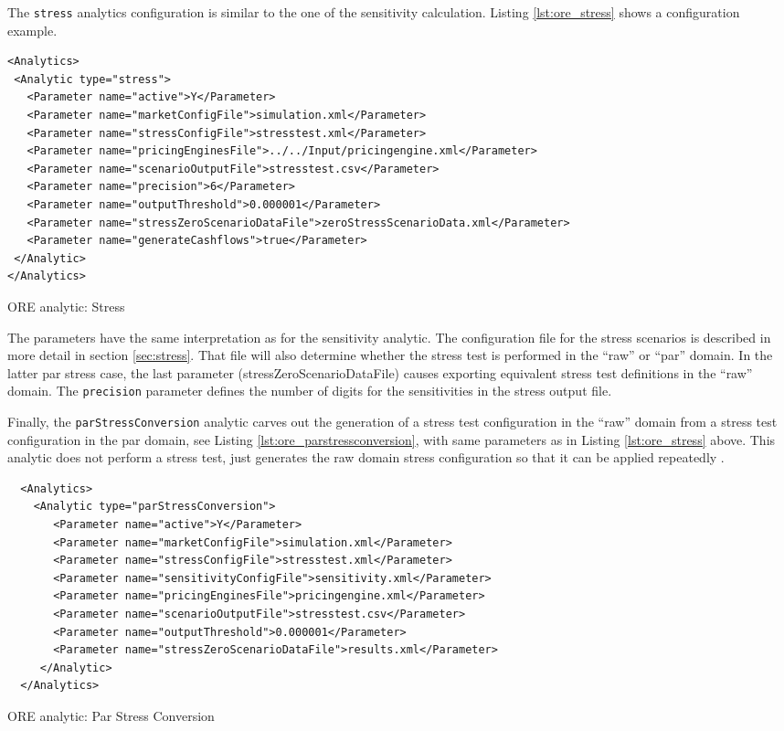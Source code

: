 The {\tt stress} analytics configuration is similar to the one of the sensitivity calculation.
Listing \ref{lst:ore_stress} shows a configuration example.

\begin{listing}[H]
\begin{verbatim}
<Analytics>
 <Analytic type="stress">
   <Parameter name="active">Y</Parameter>
   <Parameter name="marketConfigFile">simulation.xml</Parameter>
   <Parameter name="stressConfigFile">stresstest.xml</Parameter>
   <Parameter name="pricingEnginesFile">../../Input/pricingengine.xml</Parameter>
   <Parameter name="scenarioOutputFile">stresstest.csv</Parameter>
   <Parameter name="precision">6</Parameter>
   <Parameter name="outputThreshold">0.000001</Parameter>
   <Parameter name="stressZeroScenarioDataFile">zeroStressScenarioData.xml</Parameter>
   <Parameter name="generateCashflows">true</Parameter>
 </Analytic>
</Analytics>
\end{verbatim}
\caption{ORE analytic: Stress}
\label{lst:ore_stress}
\end{listing}

The parameters have the same interpretation as for the sensitivity analytic. The configuration file for the stress
scenarios is described in more detail in section \ref{sec:stress}. That file will also determine whether the stress test is performed in the ``raw'' or ``par'' domain. In the latter par stress case, the last parameter (stressZeroScenarioDataFile) causes exporting equivalent stress test definitions in the ``raw'' domain.
The {\tt precision} parameter defines the number of digits for the sensitivities in the stress output file.

Finally, the {\tt parStressConversion} analytic carves out the generation of a stress test configuration in the ``raw'' domain from a stress test configuration in the par domain, see Listing
\ref{lst:ore_parstressconversion}, with same parameters as in Listing \ref{lst:ore_stress} above. This analytic does not perform a stress test, just generates the raw domain stress configuration so that it can be applied repeatedly .

\begin{listing}[H]
\begin{verbatim}
  <Analytics>
    <Analytic type="parStressConversion">
       <Parameter name="active">Y</Parameter>
       <Parameter name="marketConfigFile">simulation.xml</Parameter>
       <Parameter name="stressConfigFile">stresstest.xml</Parameter>
       <Parameter name="sensitivityConfigFile">sensitivity.xml</Parameter>
       <Parameter name="pricingEnginesFile">pricingengine.xml</Parameter>
       <Parameter name="scenarioOutputFile">stresstest.csv</Parameter>
       <Parameter name="outputThreshold">0.000001</Parameter>
       <Parameter name="stressZeroScenarioDataFile">results.xml</Parameter>
     </Analytic>
  </Analytics>
\end{verbatim}
\caption{ORE analytic: Par Stress Conversion}
\label{lst:ore_parstressconversion}
\end{listing}

